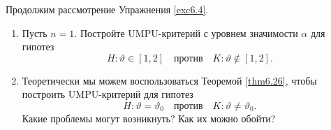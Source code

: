 \begin{exc}
	Продолжим рассмотрение Упражнения \ref{exc6.4}.
	\begin{enumerate}
		\item Пусть $n=1$. Постройте UMPU-критерий с уровнем значимости $\alpha$ для гипотез
		 \[ H:\vartheta \in [1, 2] \quad \text{против} \quad K:\vartheta \notin [1, 2].  \]
		 \item Теоретически мы можем воспользоваться Теоремой \ref{thm6.26}, чтобы построить UMPU-критерий для гипотез
		 \[ H:\vartheta = \vartheta_0 \quad \text{против} \quad K:\vartheta \neq \vartheta_0.  \]
		 Какие проблемы могут возникнуть? Как их можно обойти?
	\end{enumerate}
\end{exc}